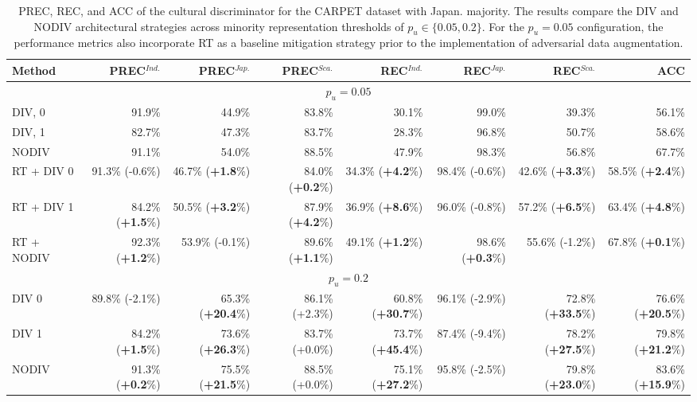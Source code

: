 %
\begin{table}
\centering
\scriptsize
\setlength{\tabcolsep}{0.1cm}
\begin{tabular}{lrrrrrrr}
\toprule
\textbf{Method} & \textbf{PREC}$^{Ind.}$  & \textbf{PREC}$^{Jap.}$ & \textbf{PREC}$^{Sca.}$ & \textbf{REC}$^{Ind.}$ & \textbf{REC}$^{Jap.}$ & \textbf{REC}$^{Sca.}$ &  \textbf{ACC}\\
\midrule
\multicolumn{8}{c}{$p_u=0.05$} \\
\midrule
DIV, 0 & 91.9\%&	44.9\%&	83.8\%&	30.1\%&	99.0\%&	39.3\%	&	56.1\%\\
DIV, 1 & 82.7\%	&	47.3\%&	83.7\%&	28.3\%&	96.8\% &	50.7\% &	58.6\%\\
NODIV & 91.1\%&	54.0\%&	88.5\%&	47.9\%&	98.3\%&	56.8\%	&	67.7\%	\\
\midrule
RT + DIV 0      & 91.3\% (-0.6\%) & 46.7\% (\textbf{+1.8}\%) & 84.0\% (\textbf{+0.2}\%) & 34.3\% (\textbf{+4.2}\%) & 98.4\% (-0.6\%) & 42.6\% (\textbf{+3.3}\%) & 58.5\% (\textbf{+2.4}\%) \\
RT + DIV 1      & 84.2\% (\textbf{+1.5}\%) & 50.5\% (\textbf{+3.2}\%) & 87.9\% (\textbf{+4.2}\%) & 36.9\% (\textbf{+8.6}\%) & 96.0\% (-0.8\%) & 57.2\% (\textbf{+6.5}\%) & 63.4\% (\textbf{+4.8}\%) \\
RT + NODIV      & 92.3\% (\textbf{+1.2}\%) & 53.9\% (-0.1\%) & 89.6\% (\textbf{+1.1}\%) & 49.1\% (\textbf{+1.2}\%) & 98.6\% (\textbf{+0.3}\%) & 55.6\% (-1.2\%) & 67.8\% (\textbf{+0.1}\%) \\
\midrule
\multicolumn{8}{c}{$p_u=0.2$} \\
\midrule
DIV 0           & 89.8\% (-2.1\%) & 65.3\% (\textbf{+20.4}\%) & 86.1\% (+2.3\%) & 60.8\% (\textbf{+30.7}\%) & 96.1\% (-2.9\%) & 72.8\% (\textbf{+33.5}\%) & 76.6\% (\textbf{+20.5}\%) \\
DIV 1           & 84.2\% (\textbf{+1.5}\%) & 73.6\% (\textbf{+26.3}\%) & 83.7\% (+0.0\%) & 73.7\% (\textbf{+45.4}\%) & 87.4\% (-9.4\%) & 78.2\% (\textbf{+27.5}\%) & 79.8\% (\textbf{+21.2}\%) \\
NODIV           & 91.3\% (\textbf{+0.2}\%) & 75.5\% (\textbf{+21.5}\%) & 88.5\% (+0.0\%) & 75.1\% (\textbf{+27.2}\%) & 95.8\% (-2.5\%) & 79.8\% (\textbf{+23.0}\%) & 83.6\% (\textbf{+15.9}\%) \\
\bottomrule
\end{tabular}
\caption{PREC, REC, and ACC of the cultural discriminator for the CARPET dataset with Japan. majority. The results compare the DIV and NODIV architectural strategies across minority representation thresholds of $p_u \in \{0.05, 0.2\}$. For the $p_u = 0.05$ configuration, the performance metrics also incorporate RT as a baseline mitigation strategy prior to the implementation of adversarial data augmentation.}
\label{ch3:tab:discr:CJ}
\end{table}
%


